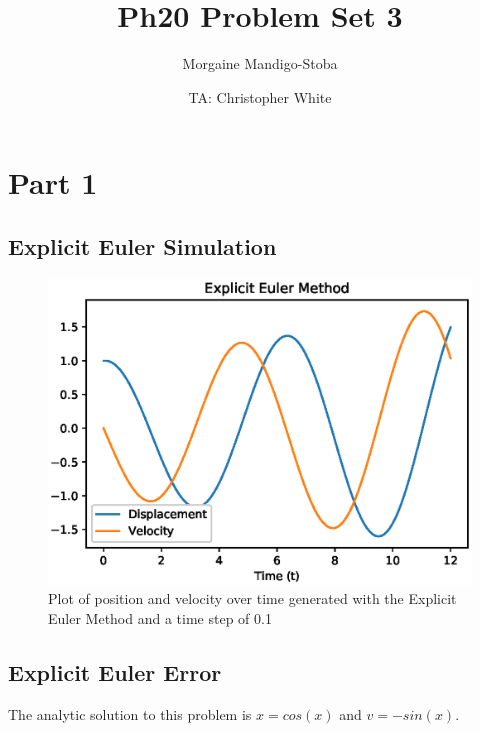 \documentclass{article}
\title{Ph20 Problem Set 3}
\author{Morgaine Mandigo-Stoba}
\date{TA: Christopher White}
\begin{document}
\maketitle

\section{Part 1}

\subsection{Explicit Euler Simulation}

\begin{figure}[ht]
\centering
\includegraphics[scale=0.35]{exp_euler.eps}
\caption{Plot of position and velocity over time generated with the Explicit Euler Method and a time step of 0.1}
\label{fig:expeuler}
\end{figure}

\subsection{Explicit Euler Error}

The analytic solution to this problem is $x=cos(x)$ and $v=-sin(x)$. 
\end{document}
